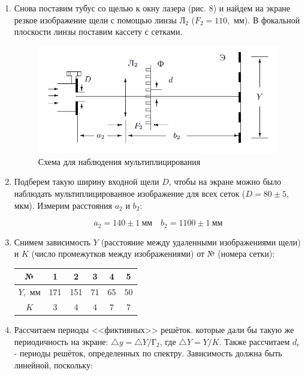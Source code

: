 \documentclass[a4paper, 12pt]{article}%
\begin{document}
\begin{enumerate}

\item Снова поставим тубус со щелью к окну лазера (рис. 8) и найдем на экране резкое изображение щели с помощью линзы $\text{Л}_2$ ($F_2 = 110,$ мм). В фокальной плоскости линзы поставим кассету с сетками.

\begin{figure}[h!]
    \centering
	\includegraphics[width = 0.8\linewidth]{images/8.png}
	\caption{Схема для наблюдения мультиплицирования}
\end{figure}

\item Подберем такую ширину входной щели $D$, чтобы на экране можно было наблюдать мультиплицированное изображение для всех сеток ($D = 80 \pm 5,$ мкм). Измерим расстояния $a_2$ и $b_2$:

\[a_2 = 140 \pm 1 \: \text{мм} \quad b_2 = 1100 \pm 1 \: \text{мм}\]

\item Снимем зависимость $Y$ (расстояние между удаленными изображениями щели) и $K$ (число промежутков между изображениями) от № (номера сетки):

\begin{center}
\begin{tabular}{|c|c|c|c|c|c|}
\hline 
№ & 1 & 2 & 3 & 4 & 5 \\ 
\hline 
$Y,$ мм & 171 & 151 & 71 & 65 & 50 \\ 
\hline 
$K$ & 3 & 4 & 4 & 7 & 7 \\ 
\hline 
\end{tabular} 
\end{center}

\item Рассчитаем периоды <<фиктивных>> решёток. которые дали бы такую же периодичность на экране: $\bigtriangleup y = \bigtriangleup Y / \text{Г}_2$, где $\bigtriangleup Y = Y/K$. Также рассчитаем $d_c$ - периоды решёток, определенных по спектру. Зависимость должна быть линейной, поскольку:


\end{enumerate}
\end{document}

